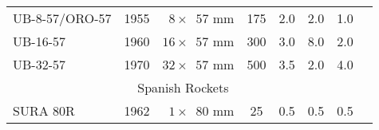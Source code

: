 \begin{twocolumntablefloat}
\begin{twocolumntable}
\begin{tabular}{lrcccccl}
\addlinespace
UB-8-57/ORO-57  &1955&$\phantom{0}8 \times \phantom{0}57$ mm&\phantom{0}175&2.0&2.0&1.0\\
UB-16-57        &1960&$\phantom{}16 \times \phantom{0}57$ mm&\phantom{0}300&3.0&8.0&2.0\\
UB-32-57        &1970&$\phantom{}32 \times \phantom{0}57$ mm&\phantom{0}500&3.5&2.0&4.0\\
\midrule
\multicolumn{7}{c}{Spanish Rockets}\\
\midrule
SURA 80R        &1962&$\phantom{0}1 \times \phantom{0}80$ mm&\phantom{00}25&0.5&0.5&0.5\\
\bottomrule
\end{tabular}
\end{twocolumntable}
\end{twocolumntablefloat}